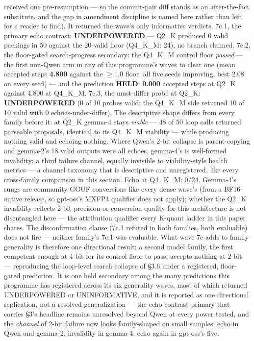 received one pre-resumption --- so the commit-pair diff stands as an after-the-fact substitute, and the gap in amendment discipline is named here rather than left for a reader to find). It returned the wave's only informative verdicts. 7c.1, the primary echo contrast: \textbf{UNDERPOWERED} --- Q2\_K produced 0 valid packings in 50 against the 20-valid floor (Q4\_K\_M: 24), no branch claimed. 7c.2, the floor-gated search-progress secondary: the Q4\_K\_M control floor \emph{passed} --- the first non-Qwen arm in any of this programme's waves to clear one (mean accepted steps \textbf{4.800} against the $\ge$1.0 floor, all five seeds improving, best 2.08 on every seed) --- and the prediction \textbf{HELD}: \textbf{0.000} accepted steps at Q2\_K against 4.800 at Q4\_K\_M. 7c.3, the must-differ probe at Q2\_K: \textbf{UNDERPOWERED} (0 of 10 probes valid; the Q4\_K\_M side returned 10 of 10 valid with 0 echoes-under-differ). The descriptive shape differs from every family before it: at Q2\_K gemma-4 stays \emph{viable} --- 48 of 50 loop calls returned parseable proposals, identical to its Q4\_K\_M viability --- while producing nothing valid and echoing nothing. Where Qwen's 2-bit collapse is parent-copying and gemma-2's 18 valid outputs were all echoes, gemma-4's is well-formed invalidity: a third failure channel, equally invisible to viability-style health metrics --- a channel taxonomy that is descriptive and unregistered, like every cross-family comparison in this section. Echo at Q4\_K\_M: 0/24. Gemma-4's rungs are community GGUF conversions like every dense wave's (from a BF16-native release, so gpt-oss's MXFP4 qualifier does not apply); whether the Q2\_K invalidity reflects 2-bit precision or conversion quality for this architecture is not disentangled here --- the attribution qualifier every K-quant ladder in this paper shares. The disconfirmation clause (7c.1 refuted in both families, both evaluable) does not fire --- neither family's 7c.1 was evaluable. What wave 7c adds to family generality is therefore one directional result: a second model family, the first competent enough at 4-bit for its control floor to pass, accepts nothing at 2-bit --- reproducing the loop-level search collapse of \S3.6 under a registered, floor-gated prediction. It is one held secondary among the many predictions this programme has registered across its six generality waves, most of which returned UNDERPOWERED or UNINFORMATIVE, and it is reported as one directional replication, not a resolved generalization --- the echo-contrast primary that carries \S3's headline remains unresolved beyond Qwen at every power tested, and the \emph{channel} of 2-bit failure now looks family-shaped on small samples: echo in Qwen and gemma-2, invalidity in gemma-4, echo again in gpt-oss's five.


